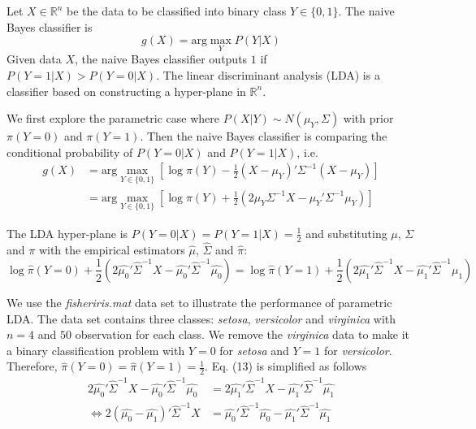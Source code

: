 \documentclass[a4paper, 11pt]{article}
\begin{document}
Let $X\in\mathbb{R}^n$ be the data to be classified into binary class $Y \in \{0, 1\}$. The naive Bayes classifier is 
\begin{equation}
g(X) = \text{arg}\max_Y P(Y|X)
\end{equation}
Given data $X$, the naive Bayes classifier outputs $1$ if $P(Y=1|X) > P(Y=0|X)$. The linear discriminant analysis (LDA) is a classifier based on constructing a hyper-plane in $\mathbb{R}^n$. 

We first explore the parametric case where $P(X|Y)\sim N(\mu_Y, \Sigma)$ with prior $\pi(Y=0)$ and $\pi(Y=1)$. Then the naive Bayes classifier is comparing the conditional probability of $P(Y=0|X)$ and $P(Y=1|X)$, i.e.
\begin{equation}
\begin{split}
g(X) & = \text{arg}\max_{Y\in\{0,1\}}\left[\log\pi(Y) - \frac{1}{2}(X - \mu_Y)'\Sigma^{-1}(X - \mu_Y) \right]\\
 & = \text{arg}\max_{Y\in\{0,1\}}\left[\log\pi(Y) + \frac{1}{2}(2\mu_Y\Sigma^{-1}X - \mu_Y'\Sigma^{-1}\mu_Y) \right]
\end{split}
\end{equation}

The LDA hyper-plane is $P(Y=0|X) = P(Y=1|X) = \frac{1}{2}$ and substituting $\mu$, $\Sigma$ and $\pi$ with the empirical estimators $\hat{\mu}$, $\hat{\Sigma}$ and $\hat{\pi}$:
\begin{equation}
\log\hat{\pi}(Y=0) + \frac{1}{2}(2\hat{\mu_0}'\hat{\Sigma}^{-1}X - \hat{\mu_0}'\hat{\Sigma}^{-1}\hat{\mu_0}) = \log\hat{\pi}(Y=1) + \frac{1}{2}(2\hat{\mu_1}'\hat{\Sigma}^{-1}X - \hat{\mu_1}'\hat{\Sigma}^{-1}\hat{\mu_1})
\end{equation}

We use the \textit{fisheriris.mat} data set to illustrate the performance of parametric LDA. The data set contains three classes: \textit{setosa}, \textit{versicolor} and \textit{virginica} with $n = 4$ and $50$ observation for each class. We remove the \textit{virginica} data to make it a binary classification problem with $Y = 0$ for \textit{setosa} and $Y=1$ for \textit{versicolor}. Therefore, $\hat{\pi}(Y=0) = \hat{\pi}(Y=1) = \frac{1}{2}$. Eq. (13) is simplified as follows
\begin{equation}
\begin{split}
2\hat{\mu_0}'\hat{\Sigma}^{-1}X - \hat{\mu_0}'\hat{\Sigma}^{-1}\hat{\mu_0} & = 2\hat{\mu_1}'\hat{\Sigma}^{-1}X - \hat{\mu_1}'\hat{\Sigma}^{-1}\hat{\mu_1}\\
\iff 2(\hat{\mu_0} - \hat{\mu_1})'\hat{\Sigma}^{-1}X & = \hat{\mu_0}'\hat{\Sigma}^{-1}\hat{\mu_0} - \hat{\mu_1}'\hat{\Sigma}^{-1}\hat{\mu_1}
\end{split}
\end{equation}
\end{document}
